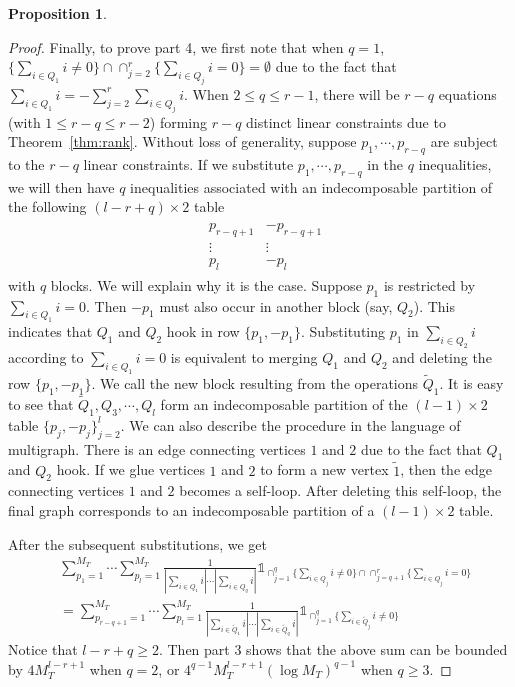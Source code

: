 \documentclass[11pt]{article}
\numberwithin{equation}{section}
\theoremstyle{plain}
\theoremstyle{definition}
\theoremstyle{definition}
\theoremstyle{assumption}
\theoremstyle{proposition}
\newtheorem{proposition}{Proposition}[section]
\theoremstyle{proposition}
\theoremstyle{example}
\theoremstyle{lemma}
\theoremstyle{theorem}
\theoremstyle{remark}
\begin{document}
\begin{proposition}
\begin{proof}
Finally, to prove part 4, we first note that when $q = 1$, $\{\sum_{i\in Q_1} i \neq 0\}\cap\cap_{j=2}^{r}\{\sum_{i\in Q_j} i = 0\} = \emptyset$ due to the fact that $\sum_{i\in Q_1}i = -\sum_{j=2}^{r}\sum_{i\in Q_j}i$. When $2\leqslant q\leqslant r-1$, there will be $r - q$ equations (with $1\leqslant r-q\leqslant r-2$) forming $r-q$ distinct linear constraints due to Theorem~\ref{thm:rank}. Without loss of generality, suppose $p_1,\cdots,p_{r-q}$ are subject to the $r-q$ linear constraints. If we substitute $p_1,\cdots,p_{r-q}$ in the $q$ inequalities, we will then have $q$ inequalities associated with an indecomposable partition of the following $(l - r + q)\times 2$ table 
\begin{align*}
\begin{matrix}
&p_{r-q+1}&-p_{r-q+1} \\
&\vdots&\vdots \\
&p_l&-p_l
\end{matrix}
\end{align*}
with $q$ blocks. We will explain why it is the case. Suppose $p_1$ is restricted by $\sum_{i\in Q_1} i = 0$. Then $-p_1$ must also occur in another block (say, $Q_2$).
This indicates that $Q_1$ and $Q_2$ hook in row $\{p_1, -p_1\}$. Substituting $p_1$ in $\sum_{i\in Q_2} i$ according to $\sum_{i\in Q_1} i = 0$ is equivalent to merging $Q_1$ and $Q_2$ and deleting the row $\{p_1,-p_1\}$. We call the new block resulting from the operations $\tilde{Q}_1$. It is easy to see that $\tilde{Q}_1,Q_3,\cdots,Q_l$ form an indecomposable partition of the $(l -1)\times 2$ table $\{p_j, -p_j\}_{j=2}^l$. We can also describe the procedure in the language of multigraph. There is an edge connecting vertices $1$ and $2$ due to the fact that $Q_1$ and $Q_2$ hook. If we glue vertices $1$ and $2$ to form a new vertex $\tilde{1}$, then the edge connecting vertices $1$ and $2$ becomes a self-loop. After deleting this self-loop, the final graph corresponds to an indecomposable partition of a $(l -1)\times 2$ table.

After the subsequent substitutions, we get
\begin{align*}
&\sum_{p_1=1}^{M_T}\cdots\sum_{p_l=1}^{M_T}\frac{1}{|\sum_{i\in Q_1} i|\cdots|\sum_{i\in Q_q} i|}\mathds{1}_{\cap_{j=1}^q\{\sum_{i\in Q_j} i \neq 0\}\cap\cap_{j=q+1}^{r}\{\sum_{i\in Q_j} i = 0\}} \\
&=\sum_{p_{r-q+1}=1}^{M_T}\cdots\sum_{p_l=1}^{M_T}\frac{1}{|\sum_{i\in \tilde{Q}_1} i|\cdots|\sum_{i\in \tilde{Q}_q} i|}\mathds{1}_{\cap_{j=1}^q\{\sum_{i\in \tilde{Q}_j} i \neq 0\}}
\end{align*}
Notice that $l - r + q \geqslant 2$. Then part 3 shows that the above sum can be bounded by $4 M_T^{l - r + 1}$ when $q = 2$, or $4^{q-1} M_T^{l-r+1}(\log M_T)^{q-1}$ when $q\geqslant3$.

\end{proof}
\end{proposition}
\end{document}
